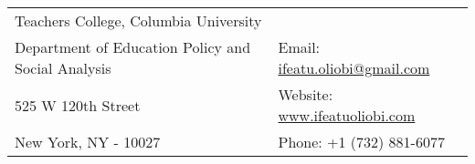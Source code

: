 \documentclass[letterpaper, 11pt]{article}
\begin{document}


\begin{center}
\begin{tabular}{l l}
Teachers College, Columbia University    &  \\
Department of Education Policy and Social Analysis    &  \hspace{1in} Email: \href{mailto:ifeatu.oliobi@gmail.com}{ifeatu.oliobi@gmail.com}  \\
525 W 120th Street             &  \hspace{1in}  Website: \href{www.ifeatuoliobi.com}{www.ifeatuoliobi.com} \\
New York, NY - 10027 & \hspace{1.4in} Phone: +1 (732) 881-6077 \\
\end{tabular}
\end{center}

\vspace{1em}


\setlength{\tabcolsep}{8pt}
\end{document}
